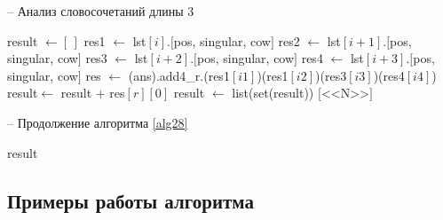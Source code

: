 \documentclass[main]{subfiles}
\begin{document}
\begin{algorithm}[!h]
	\caption{-- Анализ словосочетаний длины 3}\label{alg28}
	\begin{algorithmic}[1]
		\State result $\gets [\, ]$ 
		\State res1 $\gets$ lst$[i]$.$[$pos, singular, cow$]$
		\State res2 $\gets$ lst$[i + 1]$.$[$pos, singular, cow$]$
		\State res3 $\gets$ lst$[i + 2]$.$[$pos, singular, cow$]$
		\State res4 $\gets$ lst$[i + 3]$.$[$pos, singular, cow$]$
		\State res $\gets$ (ans).add4\_r.(res1$[i1]$)(res1$[i2]$)(res3$[i3]$)(res4$[i4]$) 
		\State result$\gets$ result $+$ res$[r][0]$
		\EndFor
			\EndIf
		\EndFor
		\EndFor
		\EndFor
		\EndFor
		\State result $\gets$ list(set(result))
		\State \Return $[$<<N>>$]$
	\end{algorithmic}
\end{algorithm}

\begin{algorithm}[!h]
	\caption{-- Продолжение алгоритма \ref{alg28}}\label{alg29}
	\begin{algorithmic}[1]
		\algrestore{bkbreak}
		\EndIf
		\EndIf
		\EndFor
		\State \Return result
		\EndFunction
	\end{algorithmic}
\end{algorithm}
\subsection{Примеры работы алгоритма}
\end{document}
